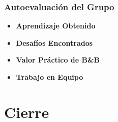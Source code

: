 \documentclass[aspectratio=169]{beamer}
\begin{document}
\begin{frame}
    \frametitle{Autoevaluación del Grupo}
    \justifying
    \vspace{0.5cm}
    \begin{itemize}
        \item \textbf{Aprendizaje Obtenido}
        \vspace{0.3cm}
        \item \textbf{Desafíos Encontrados}
        \vspace{0.3cm}
        \item \textbf{Valor Práctico de B\&B}
        \vspace{0.3cm}
        \item \textbf{Trabajo en Equipo}
    \end{itemize}
\end{frame}

\section{Cierre}

\begin{frame}[plain]
    \centering
    \vspace{2.5cm}
    \Huge {}
    
    \vspace{1cm}
    \large {}
    
    \vspace{1.5cm}
    \scriptsize {}
\end{frame}
\end{document}
